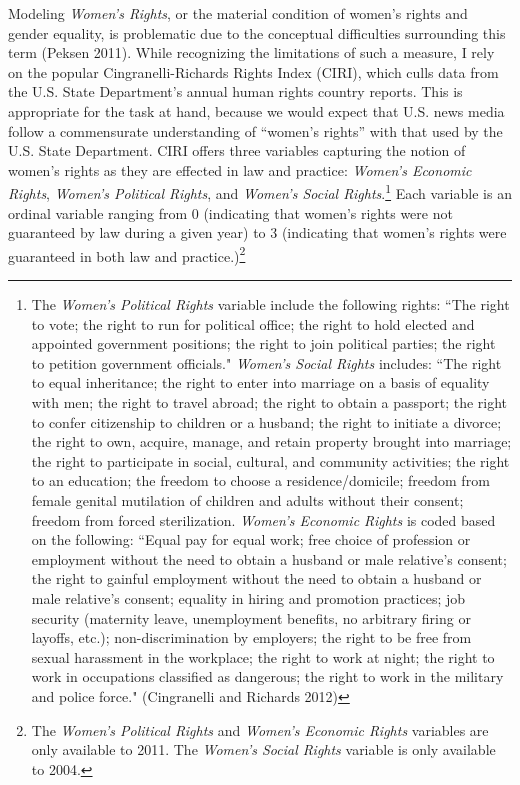 \documentclass[11pt, oneside]{article}
\begin{document}
Modeling \emph{Women's Rights}, or the material condition of women's rights and gender equality, is problematic due to the conceptual difficulties surrounding this term (Peksen 2011). While recognizing the limitations of such a measure, I rely on the popular Cingranelli-Richards Rights Index (CIRI), which culls data from the U.S. State Department's annual human rights country reports. This is appropriate for the task at hand, because we would expect that U.S. news media follow a commensurate understanding of ``women's rights'' with that used by the U.S. State Department. CIRI offers three variables capturing the notion of women's rights as they are effected in law and practice: \emph{Women's Economic Rights}, \emph{Women's Political Rights}, and \emph{Women's Social Rights}.\footnote{\hspace{5}The \emph{Women's Political Rights} variable include the following rights: ``The right to vote; the right to run for political office; the right to hold elected and appointed government positions; the right to join political parties; the right to petition government officials." \emph{Women's Social Rights} includes: ``The right to equal inheritance; the right to enter into marriage on a basis of equality with men; the right to travel abroad; the right to obtain a passport; the right to confer citizenship to children or a husband; the right to initiate a divorce; the right to own, acquire, manage, and retain property brought into marriage; the right to participate in social, cultural, and community activities; the right to an education; the freedom to choose a residence/domicile; freedom from female genital mutilation of children and adults without their consent; freedom from forced sterilization. \emph{Women's Economic Rights} is coded based on the following: ``Equal pay for equal work; free choice of profession or employment without the need to obtain a husband or male relative's consent; the right to gainful employment without the need to obtain a husband or male relative's consent; equality in hiring and promotion practices; job security (maternity leave, unemployment benefits, no arbitrary firing or layoffs, etc.); non-discrimination by employers; the right to be free from sexual harassment in the workplace; the right to work at night; the right to work in occupations classified as dangerous; the right to work in the military and police force."  (Cingranelli and Richards 2012)}  Each variable is an ordinal variable ranging from 0 (indicating that women's rights were not guaranteed by law during a given year) to 3 (indicating that women's rights were guaranteed in both law and practice.)\footnote{\hspace{5}The \emph{Women's Political Rights} and \emph{Women's Economic Rights} variables are only available to 2011. The \emph{Women's Social Rights} variable is only available to 2004.}
\end{document}
